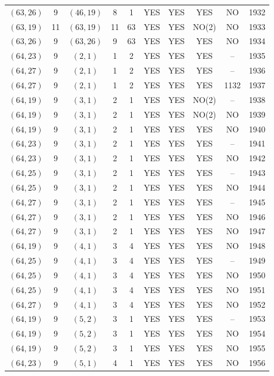\begin{longtable}{|c|c|c|c|c|c|c|c|c|c|}
$(63, 26)$ & 9 & $(46, 19)$ & 8 & 1 & YES & YES & YES & NO & 1932\\
$(63, 19)$ & 11 & $(63, 19)$ & 11 & 63 & YES & YES & NO(2) & NO & 1933\\
$(63, 26)$ & 9 & $(63, 26)$ & 9 & 63 & YES & YES & YES & NO & 1934\\
$(64, 23)$ & 9 & $(2, 1)$ & 1 & 2 & YES & YES & YES & -- & 1935\\
$(64, 27)$ & 9 & $(2, 1)$ & 1 & 2 & YES & YES & YES & -- & 1936\\
$(64, 27)$ & 9 & $(2, 1)$ & 1 & 2 & YES & YES & YES & 1132 & 1937\\
$(64, 19)$ & 9 & $(3, 1)$ & 2 & 1 & YES & YES & NO(2) & -- & 1938\\
$(64, 19)$ & 9 & $(3, 1)$ & 2 & 1 & YES & YES & NO(2) & NO & 1939\\
$(64, 19)$ & 9 & $(3, 1)$ & 2 & 1 & YES & YES & YES & NO & 1940\\
$(64, 23)$ & 9 & $(3, 1)$ & 2 & 1 & YES & YES & YES & -- & 1941\\
$(64, 23)$ & 9 & $(3, 1)$ & 2 & 1 & YES & YES & YES & NO & 1942\\
$(64, 25)$ & 9 & $(3, 1)$ & 2 & 1 & YES & YES & YES & -- & 1943\\
$(64, 25)$ & 9 & $(3, 1)$ & 2 & 1 & YES & YES & YES & NO & 1944\\
$(64, 27)$ & 9 & $(3, 1)$ & 2 & 1 & YES & YES & YES & -- & 1945\\
$(64, 27)$ & 9 & $(3, 1)$ & 2 & 1 & YES & YES & YES & NO & 1946\\
$(64, 27)$ & 9 & $(3, 1)$ & 2 & 1 & YES & YES & YES & NO & 1947\\
$(64, 19)$ & 9 & $(4, 1)$ & 3 & 4 & YES & YES & YES & NO & 1948\\
$(64, 25)$ & 9 & $(4, 1)$ & 3 & 4 & YES & YES & YES & -- & 1949\\
$(64, 25)$ & 9 & $(4, 1)$ & 3 & 4 & YES & YES & YES & NO & 1950\\
$(64, 25)$ & 9 & $(4, 1)$ & 3 & 4 & YES & YES & YES & NO & 1951\\
$(64, 27)$ & 9 & $(4, 1)$ & 3 & 4 & YES & YES & YES & NO & 1952\\
$(64, 19)$ & 9 & $(5, 2)$ & 3 & 1 & YES & YES & YES & -- & 1953\\
$(64, 19)$ & 9 & $(5, 2)$ & 3 & 1 & YES & YES & YES & NO & 1954\\
$(64, 19)$ & 9 & $(5, 2)$ & 3 & 1 & YES & YES & YES & NO & 1955\\
$(64, 23)$ & 9 & $(5, 1)$ & 4 & 1 & YES & YES & YES & NO & 1956\\

\end{longtable}
